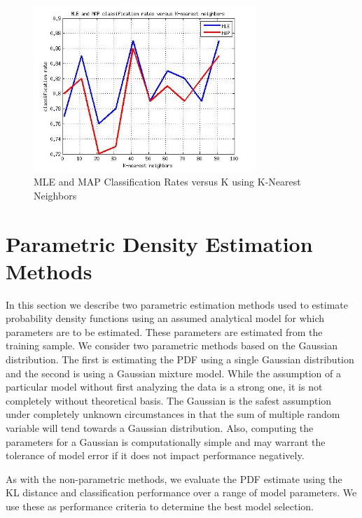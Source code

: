\documentclass[journal]{IEEEtran}
\begin{document}
\begin{figure}
\centering
\includegraphics[width=3.3in]{../images/ClassRate_KNN.jpg}
\caption{MLE and MAP Classification Rates versus K using K-Nearest Neighbors}
\label{fig:ClassRate_KNN}
\end{figure}

\section{Parametric Density Estimation Methods}
\par In this section we describe two parametric estimation methods used to estimate probability density functions using an assumed analytical model for which parameters are to be estimated. These parameters are estimated from the training sample. We consider two parametric methods based on the Gaussian distribution. The first is estimating the PDF using a single Gaussian distribution and the second is using a Gaussian mixture model. While the assumption of a particular model without first analyzing the data is a strong one, it is not completely without theoretical basis. The Gaussian is the safest assumption under completely unknown circumstances in that the sum of multiple random variable will tend towards a Gaussian distribution. Also, computing the parameters for a Gaussian is computationally simple and may warrant the tolerance of model error if it does not impact performance negatively.
\par As with the non-parametric methods, we evaluate the PDF estimate using the KL distance and classification performance over a range of model parameters. We use these as performance criteria to determine the best model selection.
\end{document}
